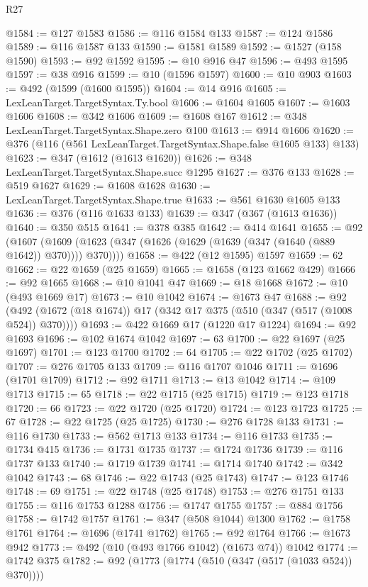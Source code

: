 \begin{lexlean}{R27}
\begin{coremodule}
@1584 := @127 @1583
@1586 := @116 @1584 @133
@1587 := @124 @1586
@1589 := @116 @1587 @133
@1590 := @1581 @1589
@1592 := @1527 (@158 @1590)
@1593 := @92 @1592
@1595 := @10 @916 @47
@1596 := @493 @1595
@1597 := @38 @916
@1599 := @10 (@1596 @1597)
@1600 := @10 @903
@1603 := @492 (@1599 (@1600 @1595))
@1604 := @14 @916
@1605 := LexLeanTarget.TargetSyntax.Ty.bool
@1606 := @1604 @1605
@1607 := @1603 @1606
@1608 := @342 @1606
@1609 := @1608 @167
@1612 := @348 LexLeanTarget.TargetSyntax.Shape.zero @100
@1613 := @914 @1606
@1620 := @376 (@116 (@561 LexLeanTarget.TargetSyntax.Shape.false @1605 @133) @133)
@1623 := @347 (@1612 (@1613 @1620))
@1626 := @348 LexLeanTarget.TargetSyntax.Shape.succ @1295
@1627 := @376 @133
@1628 := @519 @1627
@1629 := @1608 @1628
@1630 := LexLeanTarget.TargetSyntax.Shape.true
@1633 := @561 @1630 @1605 @133
@1636 := @376 (@116 @1633 @133)
@1639 := @347 (@367 (@1613 @1636))
@1640 := @350 @515
@1641 := @378 @385
@1642 := @414 @1641
@1655 := @92
    (@1607 (@1609 (@1623 (@347 (@1626 (@1629 (@1639 (@347 (@1640 (@889 @1642)) @370)))) @370))))
@1658 := @422 (@12 @1595) @1597
@1659 := 62
@1662 := @22 @1659 (@25 @1659)
@1665 := @1658 (@123 @1662 @429)
@1666 := @92 @1665
@1668 := @10 @1041 @47
@1669 := @18 @1668
@1672 := @10 (@493 @1669 @17)
@1673 := @10 @1042
@1674 := @1673 @47
@1688 := @92 (@492 (@1672 (@18 @1674)) @17 (@342 @17 @375 (@510 (@347 (@517 (@1008 @524)) @370))))
@1693 := @422 @1669 @17 (@1220 @17 @1224)
@1694 := @92 @1693
@1696 := @102 @1674 @1042
@1697 := 63
@1700 := @22 @1697 (@25 @1697)
@1701 := @123 @1700
@1702 := 64
@1705 := @22 @1702 (@25 @1702)
@1707 := @276 @1705 @133
@1709 := @116 @1707 @1046
@1711 := @1696 (@1701 @1709)
@1712 := @92 @1711
@1713 := @13 @1042
@1714 := @109 @1713
@1715 := 65
@1718 := @22 @1715 (@25 @1715)
@1719 := @123 @1718
@1720 := 66
@1723 := @22 @1720 (@25 @1720)
@1724 := @123 @1723
@1725 := 67
@1728 := @22 @1725 (@25 @1725)
@1730 := @276 @1728 @133
@1731 := @116 @1730
@1733 := @562 @1713 @133
@1734 := @116 @1733
@1735 := @1734 @415
@1736 := @1731 @1735
@1737 := @1724 @1736
@1739 := @116 @1737 @133
@1740 := @1719 @1739
@1741 := @1714 @1740
@1742 := @342 @1042
@1743 := 68
@1746 := @22 @1743 (@25 @1743)
@1747 := @123 @1746
@1748 := 69
@1751 := @22 @1748 (@25 @1748)
@1753 := @276 @1751 @133
@1755 := @116 @1753 @1288
@1756 := @1747 @1755
@1757 := @884 @1756
@1758 := @1742 @1757
@1761 := @347 (@508 @1044) @1300
@1762 := @1758 @1761
@1764 := @1696 (@1741 @1762)
@1765 := @92 @1764
@1766 := @1673 @942
@1773 := @492 (@10 (@493 @1766 @1042) (@1673 @74)) @1042
@1774 := @1742 @375
@1782 := @92 (@1773 (@1774 (@510 (@347 (@517 (@1033 @524)) @370))))

\end{coremodule}
\end{lexlean}
